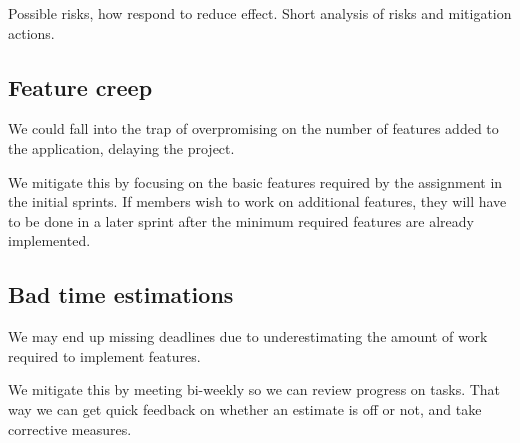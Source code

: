 \documentclass{article}
\begin{document}
Possible risks, how respond to reduce effect.
Short analysis of risks and mitigation actions.

\subsection*{Feature creep}

We could fall into the trap of overpromising on the number of features added to the application, delaying the project.

We mitigate this by focusing on the basic features required by the assignment in the initial sprints. If members wish to work on additional features, they will have to be done in a later sprint after the minimum required features are already implemented.

\subsection*{Bad time estimations}

We may end up missing deadlines due to underestimating the amount of work required to implement features.

We mitigate this by meeting bi-weekly so we can review progress on tasks. That way we can get quick feedback on whether an estimate is off or not, and take corrective measures.
\end{document}
